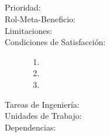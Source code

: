 \subsection{}

\begin{description}
    \item[Prioridad:]
    \item[Rol-Meta-Beneficio:] 
    \item[Limitaciones:] 
    \item[Condiciones de Satisfacción:]
        \begin{enumerate}
            \item 
            \item 
            \item 
        \end{enumerate}
    \item[Tareas de Ingeniería:]
    \item[Unidades de Trabajo:]
    \item[Dependencias:]
\end{description}

\newpage
